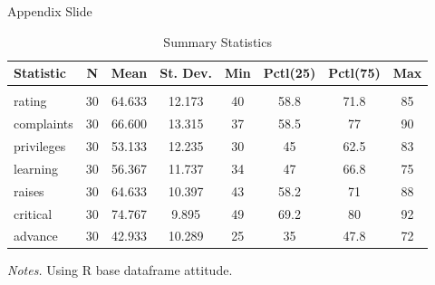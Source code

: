 \documentclass[aspectratio=169]{beamer}
\begin{document}
\begin{frame}{Appendix Slide}\label{appendix1}

\begin{table}
    \caption{Summary Statistics}
    \label{appendix_summ_stat}
    \begin{adjustbox}{max width = \textwidth, width = 0.8 \textwidth, center}
        \begin{threeparttable}
            \begin{tabular}{@{} lccccccc @{}} 
                \toprule
                Statistic & \multicolumn{1}{c}{N} & \multicolumn{1}{c}{Mean} & \multicolumn{1}{c}{St. Dev.} & \multicolumn{1}{c}{Min} & \multicolumn{1}{c}{Pctl(25)} & \multicolumn{1}{c}{Pctl(75)} & \multicolumn{1}{c}{Max} \\ 
                \hline \\[-1.8ex] 
                rating & 30 & 64.633 & 12.173 & 40 & 58.8 & 71.8 & 85 \\ 
                complaints & 30 & 66.600 & 13.315 & 37 & 58.5 & 77 & 90 \\ 
                privileges & 30 & 53.133 & 12.235 & 30 & 45 & 62.5 & 83 \\ 
                learning & 30 & 56.367 & 11.737 & 34 & 47 & 66.8 & 75 \\ 
                raises & 30 & 64.633 & 10.397 & 43 & 58.2 & 71 & 88 \\ 
                critical & 30 & 74.767 & 9.895 & 49 & 69.2 & 80 & 92 \\ 
                advance & 30 & 42.933 & 10.289 & 25 & 35 & 47.8 & 72 \\ 
                \bottomrule
            \end{tabular} 
            \begin{tablenotes}
                \item \textit{Notes.} Using R base dataframe attitude.
            \end{tablenotes}
        \end{threeparttable}
    \end{adjustbox}
\end{table}
    
    \hyperlink{main1}{}
\end{frame}
\end{document}
